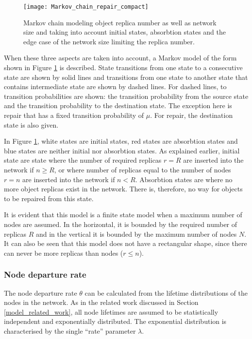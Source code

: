 \begin{figure}[htbp]
 \centering
 \texttt{[image: Markov\_chain\_repair\_compact]}
 \caption{Markov chain modeling object replica number as well as network size and taking into account initial states, absorbtion states and the edge case of the network size limiting the replica number.}
 \label{fig_markov_chain}
\end{figure}
%
When these three aspects are taken into account, a Markov model of the form shown in Figure \ref{fig_markov_chain} is described. State transitions from one state to a consecutive state are shown by solid lines and transitions from one state to another state that contains intermediate state are shown by dashed lines. For dashed lines, to transition probabilities are shown: the transition probability from the source state and the transition probability to the destination state. The exception here is repair that has a fixed transition probability of $\mu$. For repair, the destination state is also given.

In Figure \ref{fig_markov_chain}, white states are initial states, red states are absorbtion states and blue states are neither initial nor absorbtion states. As explained earlier, initial state are state where the number of required replicas $r=R$ are inserted into the network if $n\geq R$, or where number of replicas equal to the number of nodes $r=n$ are inserted into the network if $n < R$. Absorbtion states are where no more object replicas exist in the network. There is, therefore, no way for objects to be repaired from this state.

It is evident that this model is a finite state model when a maximum number of nodes are assumed. In the horizontal, it is bounded by the required number of replicas $R$ and in the vertical it is bounded by the maximum number of nodes $N$. It can also be seen that this model does not have a rectangular shape, since there can never be more replicas than nodes ($r\leq n$).

\subsubsection{Node departure rate}
\label{node_departure_rate}

The node departure rate $\theta$ can be calculated from the lifetime distributions of the nodes in the network. As in the related work discussed in Section \ref{model_related_work}, all node lifetimes are assumed to be statistically independent and exponentially distributed. The exponential distribution is characterised by the single ``rate'' parameter $\lambda$.

